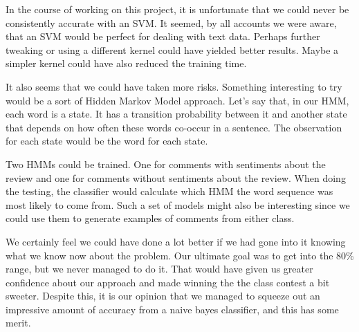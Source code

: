 \documentclass[]{report}
\begin{document}
In the course of working on this project, it is unfortunate that we could never be consistently accurate with an SVM.  It seemed, by all accounts we were aware, that an SVM would be perfect for dealing with text data.  Perhaps further tweaking or using a different kernel could have yielded better results.  Maybe a simpler kernel could have also reduced the training time.

It also seems that we could have taken more risks.  Something interesting to try would be a sort of Hidden Markov Model approach.  Let's say that, in our HMM, each word is a state.  It has a transition probability between it and another state that depends on how often these words co-occur in a sentence.  The observation for each state would be the word for each state.

Two HMMs could be trained.  One for comments with sentiments about the review and one for comments without sentiments about the review.  When doing the testing, the classifier would calculate which HMM the word sequence was most likely to come from.  Such a set of models might also be interesting since we could use them to generate examples of comments from either class.

We certainly feel we could have done a lot better if we had gone into it knowing what we know now about the problem.  Our ultimate goal was to get into the 80\% range, but we never managed to do it.  That would have given us greater confidence about our approach and made winning the the class contest a bit sweeter.  Despite this, it is our opinion that we managed to squeeze out an impressive amount of accuracy from a naive bayes classifier, and this has some merit.
\end{document}
